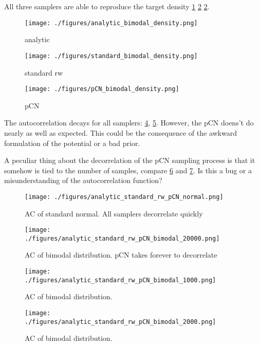 \documentclass[11pt]{article}
\begin{document}
All three samplers are able to reproduce the target density \ref{fig:hist_analytic} \ref{fig:hist_rw} \ref{fig:hist_rw}.

\begin{figure}[htbp]
\centering
\texttt{[image: ./figures/analytic\_bimodal\_density.png]}
\caption{\label{fig:hist_analytic}
analytic}
\end{figure}
\begin{figure}[htbp]
\centering
\texttt{[image: ./figures/standard\_bimodal\_density.png]}
\caption{\label{fig:hist_rw}
standard rw}
\end{figure}
\begin{figure}[htbp]
\centering
\texttt{[image: ./figures/pCN\_bimodal\_density.png]}
\caption{\label{fig:hist_pCN}
pCN}
\end{figure}

The autocorrelation decays for all samplers: \ref{fig:ac_normal}, \ref{fig:ac_bimodal}. However, the pCN doens't
do nearly as well as expected. This could be the consequence of the awkward
formulation of the potential or a bad prior.

A peculiar thing about the decorrelation of the pCN sampling process is that
it somehow is tied to the number of samples, compare \ref{fig:ac_pCN_1000} and \ref{fig:ac_pCN_2000}.
Is this a bug or a misunderstanding of the autocorrelation function? 

\begin{figure}[htbp]
\centering
\texttt{[image: ./figures/analytic\_standard\_rw\_pCN\_normal.png]}
\caption{\label{fig:ac_normal}
AC of standard normal. All samplers decorrelate quickly}
\end{figure}

\begin{figure}[htbp]
\centering
\texttt{[image: ./figures/analytic\_standard\_rw\_pCN\_bimodal\_20000.png]}
\caption{\label{fig:ac_bimodal}
AC of bimodal distribution. pCN takes forever to decorrelate}
\end{figure}

\begin{figure}[htbp]
\centering
\texttt{[image: ./figures/analytic\_standard\_rw\_pCN\_bimodal\_1000.png]}
\caption{\label{fig:ac_pCN_1000}
AC of bimodal distribution.}
\end{figure}

\begin{figure}[htbp]
\centering
\texttt{[image: ./figures/analytic\_standard\_rw\_pCN\_bimodal\_2000.png]}
\caption{\label{fig:ac_pCN_2000}
AC of bimodal distribution.}
\end{figure}
\end{document}
